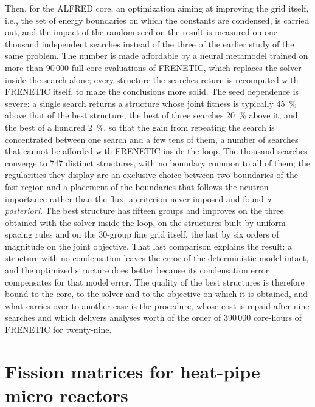 Then, for the ALFRED core, an optimization aiming at improving the grid itself,
i.e., the set of energy boundaries on which the constants are condensed, is
carried out, and the impact of the random seed on the result is measured on
one thousand independent searches instead of the three of the earlier study
of the same problem. The number is made
affordable by a neural metamodel trained on more than $90\,000$ full-core evaluations of
FRENETIC, which replaces the solver inside the search alone; every structure
the searches return is recomputed with FRENETIC itself, to make the
conclusions more solid. The seed dependence is severe: a single search returns
a structure whose joint fitness is typically \SI{45}{\percent} above that of
the best structure, the best of three searches \SI{20}{\percent} above it, and
the best of a hundred \SI{2}{\percent}, so that
the gain from repeating the search is concentrated between one search and a few
tens of them, a number of searches that cannot be afforded with FRENETIC inside
the loop. The thousand searches converge to 747 distinct
structures, with no boundary common to all of them; the regularities they display are an
exclusive choice between two boundaries of the fast region and a placement of
the boundaries that follows the neutron importance rather than the flux, a
criterion never imposed and found \emph{a posteriori}. The best structure has fifteen groups and improves on
the three obtained with the solver inside the loop, on the structures built by
uniform spacing rules and on the 30-group fine grid itself, the last by six
orders of magnitude on the joint objective. That last
comparison explains the result: a structure with no condensation leaves
the error of the deterministic model intact, and the
optimized structure does better because its condensation error compensates for
that model error. The quality of the best structures is therefore bound to the core,
to the solver and to the objective on which it is obtained, and what carries
over to another case is the procedure, whose cost is repaid after nine
searches and which delivers analyses worth of the order of $390\,000$
core-hours of FRENETIC for twenty-nine.

\section{Fission matrices for heat-pipe micro reactors}

